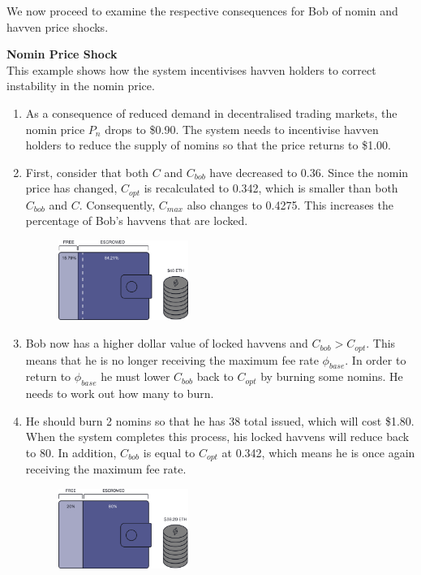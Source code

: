 \vspace{2mm}

\noindent We now proceed to examine the respective consequences for Bob of nomin and havven
price shocks.

\newpage
\noindent \textbf{Nomin Price Shock} \\

\noindent This example shows how the system incentivises havven holders
to correct instability in the nomin price.

\begin{enumerate}
    \item{As a consequence of reduced demand in decentralised trading markets,
          the nomin price \(P_n\) drops to \$0.90. The system needs to incentivise havven
          holders to reduce the supply of nomins so that the price returns to \$1.00.
    }
    \item{First, consider that both \(C\) and \(C_{bob}\) have decreased to 0.36.
          Since the nomin price has changed, \(C_{opt}\) is recalculated to 0.342, which
          is smaller than both \(C_{bob}\) and \(C\). Consequently, \(C_{max}\) also changes
          to 0.4275. This increases the percentage of Bob's havvens that are locked.
    }

    \begin{figure}[h!]
        \centering
        \includegraphics[width=0.4\textwidth]{img/pn_drop}
    \end{figure}

    \item{Bob now has a higher dollar value of locked havvens and \(C_{bob} > C_{opt}\).
          This means that he is no longer receiving the maximum fee rate
          \(\phi_{base}\). In order to return to \(\phi_{base}\) he must lower
          \(C_{bob}\) back to \(C_{opt}\) by burning some nomins. He needs to work out how
          many to burn.
    }

    \item{He should burn 2 nomins so that he has 38 total issued, which will cost
          \$1.80. When the system completes this process, his locked havvens will
          reduce back to 80. In addition, \(C_{bob}\) is equal to \(C_{opt}\) at 0.342,
          which means he is once again receiving the maximum fee rate.
    }
    \begin{figure}[h!]
    \centering
        \includegraphics[width=0.4\textwidth]{img/post_burn}
    \end{figure}


\end{enumerate}
